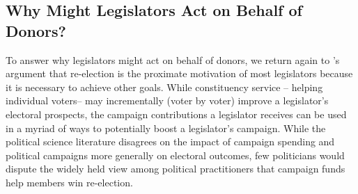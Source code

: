 \documentclass{article}
\begin{document}

\subsection{Why Might Legislators Act on Behalf of Donors?}

To answer why legislators might act on behalf of donors, we return again to \citet{Mayhew1974}'s argument that re-election is the proximate motivation of most legislators because it is necessary to achieve other goals.  While constituency service -- helping individual voters-- may incrementally (voter by voter) improve a legislator's electoral prospects, the campaign contributions a legislator receives can be used in a myriad of ways to potentially boost a legislator's campaign.  While the political science literature disagrees on the impact of campaign spending and political campaigns more generally on electoral outcomes, few politicians would dispute the widely held view among political practitioners that campaign funds help members win re-election.  
\end{document}
